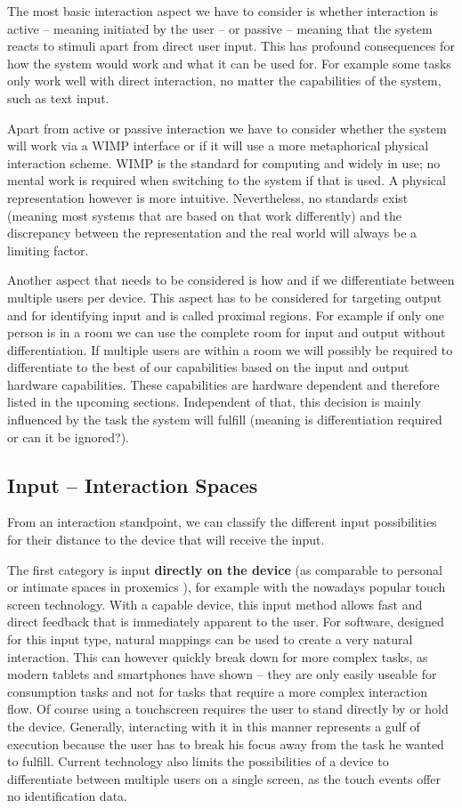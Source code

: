 The most basic interaction aspect we have to consider is whether interaction is active – meaning initiated by the user – or passive – meaning that the system reacts to stimuli apart from direct user input.
This has profound consequences for how the system would work and what it can be used for.
For example some tasks only work well with direct interaction, no matter the capabilities of the system, such as text input.

Apart from active or passive interaction we have to consider whether the system will work via a WIMP interface or if it will use a more metaphorical physical interaction scheme.
WIMP is the standard for computing and widely in use; no mental work is required when switching to the system if that is used.
A physical representation however is more intuitive.
Nevertheless, no standards exist (meaning most systems that are based on that work differently) and the discrepancy between the representation and the real world will always be a limiting factor.

Another aspect that needs to be considered is how and if we differentiate between multiple users per device.
This aspect has to be considered for targeting output and for identifying input and is called proximal regions.
For example if only one person is in a room we can use the complete room for input and output without differentiation.
If multiple users are within a room we will possibly be required to differentiate to the best of our capabilities based on the input and output hardware capabilities.
These capabilities are hardware dependent and therefore listed in the upcoming sections.
Independent of that, this decision is mainly influenced by the task the system will fulfill (meaning is differentiation required or can it be ignored?).

\subsection{Input – Interaction Spaces}

From an interaction standpoint, we can classify the different input possibilities for their distance to the device that will receive the input.

The first category is input \textbf{directly on the device} (as comparable to personal or intimate spaces in proxemics \cite{}), for example with the nowadays popular touch screen technology.
With a capable device, this input method allows fast and direct feedback that is immediately apparent to the user.
For software, designed for this input type, natural mappings can be used to create a very natural interaction.
This can however quickly break down for more complex tasks, as modern tablets and smartphones have shown – they are only easily useable for consumption tasks and not for tasks that require a more complex interaction flow.
Of course using a touchscreen requires the user to stand directly by or hold the device.
Generally, interacting with it in this manner represents a gulf of execution because the user has to break his focus away from the task he wanted to fulfill.
Current technology also limits the possibilities of a device to differentiate between multiple users on a single screen, as the touch events offer no identification data.

